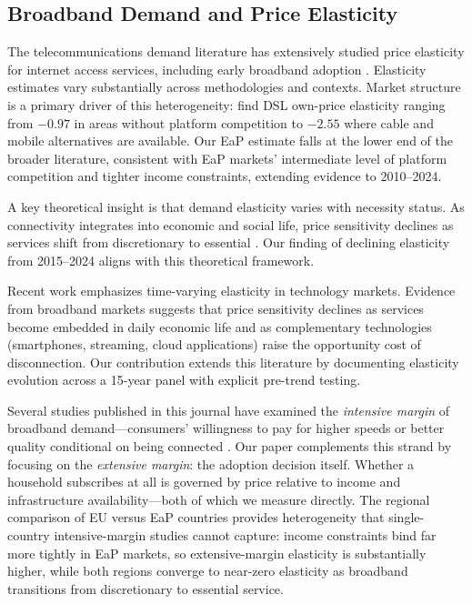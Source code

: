 \subsection{Broadband Demand and Price Elasticity}

The telecommunications demand literature has extensively studied price elasticity for internet access services, including early broadband adoption \citep{hausman2001private, rappoport2003demand}. Elasticity estimates vary substantially across methodologies and contexts. Market structure is a primary driver of this heterogeneity: \citet{cardona2009demand} find DSL own-price elasticity ranging from $-0.97$ in areas without platform competition to $-2.55$ where cable and mobile alternatives are available. Our EaP estimate falls at the lower end of the broader literature, consistent with EaP markets' intermediate level of platform competition and tighter income constraints, extending evidence to 2010--2024.

A key theoretical insight is that demand elasticity varies with necessity status. As connectivity integrates into economic and social life, price sensitivity declines as services shift from discretionary to essential \citep{becker1988theory}. Our finding of declining elasticity from 2015--2024 aligns with this theoretical framework.

Recent work emphasizes time-varying elasticity in technology markets. Evidence from broadband markets suggests that price sensitivity declines as services become embedded in daily economic life and as complementary technologies (smartphones, streaming, cloud applications) raise the opportunity cost of disconnection. Our contribution extends this literature by documenting elasticity evolution across a 15-year panel with explicit pre-trend testing.

Several studies published in this journal have examined the \textit{intensive margin} of broadband demand---consumers' willingness to pay for higher speeds or better quality conditional on being connected \citep{liu2018distinguishing, lindlacher2021low, sinclair2023broadband}. Our paper complements this strand by focusing on the \textit{extensive margin}: the adoption decision itself. Whether a household subscribes at all is governed by price relative to income and infrastructure availability---both of which we measure directly. The regional comparison of EU versus EaP countries provides heterogeneity that single-country intensive-margin studies cannot capture: income constraints bind far more tightly in EaP markets, so extensive-margin elasticity is substantially higher, while both regions converge to near-zero elasticity as broadband transitions from discretionary to essential service.


